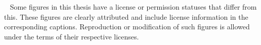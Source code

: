 \usepackage[type={CC}, modifier={by}, version={4.0}]{doclicense-di}
{%
\copyrighttext%
  {\copyrightstring\ \allrightsreservedeng}%
  {%
    \copyrightstring
    \doclicenseThis
    \blockpar
    Some figures in this thesis have a license or permission statuses that differ from this. These figures are clearly attributed and include license information in the corresponding captions. Reproduction or modification
    of such figures is allowed under the terms of their respective licenses.
}
}
